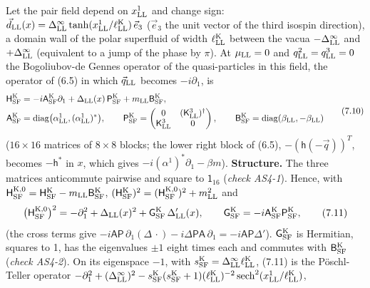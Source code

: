 \documentclass[
  10pt,
]{article}
\begin{document}
Let the pair field depend on \(x^1_{\rm LL}\) and change sign:
\(\vec d_{\rm LL}(x)=\Delta^\infty_{\rm LL}\tanh(x^1_{\rm LL}/\ell^{\rm K}_{\rm LL})\,\vec e_3\)
(\(\vec e_3\) the unit vector of the third isospin direction), a domain
wall of the polar superfluid of width \(\ell^{\rm K}_{\rm LL}\) between
the vacua \(-\Delta^\infty_{\rm LL}\) and \(+\Delta^\infty_{\rm LL}\)
(equivalent to a jump of the phase by \(\pi\)). At \(\mu_{\rm LL}=0\)
and \(q^2_{\rm LL}=q^3_{\rm LL}=0\) the Bogoliubov-de Gennes operator of
the quasi-particles in this field, the operator of (6.5) in which
\(\vec q_{\rm LL}\) becomes \(-i\partial_1\), is
\[\begin{aligned}\mathsf H^{\rm K}_{\rm SF}&=-i\mathsf A^{\rm K}_{\rm SF}\partial_1+\Delta_{\rm LL}(x)\,\mathsf P^{\rm K}_{\rm SF}+m_{\rm LL}\mathsf B^{\rm K}_{\rm SF},\\\mathsf A^{\rm K}_{\rm SF}&=\mathrm{diag}\big(\alpha^1_{\rm LL},(\alpha^1_{\rm LL})^*\big),\qquad\mathsf P^{\rm K}_{\rm SF}=\begin{pmatrix}0&(\mathsf K^3_{\rm LL})^\dagger\\\mathsf K^3_{\rm LL}&0\end{pmatrix},\qquad\mathsf B^{\rm K}_{\rm SF}=\mathrm{diag}(\beta_{\rm LL},-\beta_{\rm LL})\end{aligned}\tag{7.10}\]
(\(16\times16\) matrices of \(8\times8\) blocks; the lower right block
of (6.5), \(-(\mathsf h(-\vec q))^T\), becomes \(-\mathsf h^*\) in
\(x\), which gives \(-i(\alpha^1)^*\partial_1-\beta m\)).
\textbf{Structure.} The three matrices anticommute pairwise and square
to \(\mathsf 1_{16}\) (\emph{check AS4-1}). Hence, with
\(\mathsf H^{{\rm K},0}_{\rm SF}=\mathsf H^{\rm K}_{\rm SF}-m_{\rm LL}\mathsf B^{\rm K}_{\rm SF}\),
\((\mathsf H^{\rm K}_{\rm SF})^2=(\mathsf H^{{\rm K},0}_{\rm SF})^2+m_{\rm LL}^2\)
and
\[\big(\mathsf H^{{\rm K},0}_{\rm SF}\big)^2=-\partial_1^2+\Delta_{\rm LL}(x)^2+\mathsf G^{\rm K}_{\rm SF}\,\Delta_{\rm LL}'(x),\qquad\mathsf G^{\rm K}_{\rm SF}=-i\mathsf A^{\rm K}_{\rm SF}\mathsf P^{\rm K}_{\rm SF},\tag{7.11}\]
(the cross terms give
\(-i\mathsf A\mathsf P\,\partial_1(\Delta\,\cdot)-i\Delta\mathsf P\mathsf A\,\partial_1=-i\mathsf A\mathsf P\Delta'\)).
\(\mathsf G^{\rm K}_{\rm SF}\) is Hermitian, squares to 1, has the
eigenvalues \(\pm1\) eight times each and commutes with
\(\mathsf B^{\rm K}_{\rm SF}\) (\emph{check AS4-2}). On its eigenspace
\(-1\), with
\(s^{\rm K}_{\rm SF}=\Delta^\infty_{\rm LL}\ell^{\rm K}_{\rm LL}\),
(7.11) is the Pöschl-Teller operator
\(-\partial_1^2+(\Delta^\infty_{\rm LL})^2-s^{\rm K}_{\rm SF}(s^{\rm K}_{\rm SF}+1)(\ell^{\rm K}_{\rm LL})^{-2}\,\mathrm{sech}^2(x^1_{\rm LL}/\ell^{\rm K}_{\rm LL})\),
\end{document}

